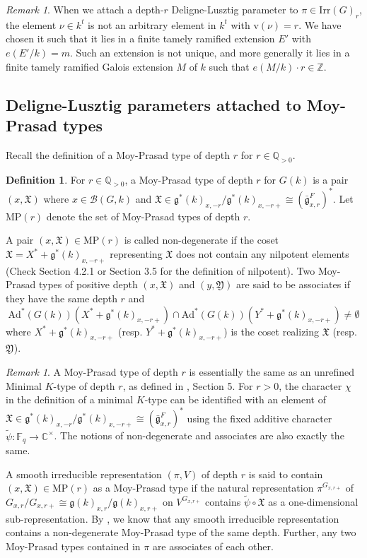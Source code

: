 \documentclass[11 pt]{article}
\numberwithin{equation}{subsection}
\theoremstyle{definition}
\newtheorem{definition}[theorem]{Definition}
\theoremstyle{remark}
\newtheorem{remark}[theorem]{Remark}
\theoremstyle{conjecture}
\newcommand{\X}{\mathfrak X}
\newcommand{\fg}{\mathfrak g}
\newcommand{\bg}{\bar{\mathfrak g}}
\newcommand{\rv}{\mathrm{v}}
\newcommand{\Irr}{\mathrm{Irr}}
\newcommand{\Ad}{\mathrm{Ad}}
\newcommand{\Z}{\mathbb Z}
\newcommand{\Q}{\mathbb Q}
\newcommand{\C}{\mathbb C}
\newcommand{\F}{\mathbb F}
\newcommand{\mf}{\mathfrak}
\newcommand{\B}{\mathcal{B}}
\begin{document}
\begin{remark}
    When we attach a depth-$r$ Deligne-Lusztig parameter to $\pi\in \Irr(G)_r$, the element $\nu \in k^t$ is not an arbitrary element in $k^t$ with $\rv(\nu)=r$. We have chosen it such that it lies in a finite tamely ramified extension $E'$ with $e(E'/k)=m$. Such an extension is not unique, and more generally it lies in a finite tamely ramified Galois extension $M$ of $k$ such that $e(M/k)\cdot r \in \Z$. 
\end{remark}

\subsection{Deligne-Lusztig parameters attached to Moy-Prasad types}
Recall the definition of a Moy-Prasad type of depth $r$ for $r \in \Q_{>0}$.
\begin{definition}
    For $r \in \Q_{>0}$, a Moy-Prasad type of depth $r$  for $G(k)$ is a pair $(x, \X)$ where $x \in \B(G,k)$ and $\X \in \fg^*(k)_{x,-r}/\fg^*(k)_{x,-r+} \cong (\bg_{x,r}^F)^*$. Let $\mathrm{MP}(r)$ denote the set of Moy-Prasad types of depth $r$.
\end{definition}
A pair  $(x, \X) \in \mathrm{MP}(r)$ is called non-degenerate if the coset $\X = X^* + \fg^*(k)_{x,-r+}$ representing $\X$ does not contain any nilpotent elements (Check \cite{chendebackertsai} Section 4.2.1 or \cite{MP94} Section 3.5 for the definition of nilpotent). Two Moy-Prasad types of positive depth $(x,\X)$ and $(y,\mf Y)$ are said to be associates if they have the same depth $r$ and 
\begin{equation*}
    \Ad^*(G(k))(X^* + \fg^*(k)_{x,-r+}) \cap \Ad^*(G(k))(Y^* + \fg^*(k)_{x,-r+}) \neq \emptyset
\end{equation*}
where $X^* + \fg^*(k)_{x,-r+}$ (resp. $Y^* + \fg^*(k)_{x,-r+}$) is the coset realizing $\X$ (resp. $\mf Y$).  
\begin{remark}
    A Moy-Prasad type of depth $r$ is essentially the same as an unrefined Minimal $K$-type of depth $r$, as defined in \cite{MP94}, Section 5. For $r>0$, the character $\chi$ in the definition of a minimal $K$-type can be identified with an element of $\X\in \fg^*(k)_{x,-r}/\fg^*(k)_{x,-r+} \cong (\bg_{x,r}^F)^*$ using the fixed additive character $\tilde \psi :\F_q\rightarrow \C^\times$. The notions of non-degenerate and associates are also exactly the same.  
\end{remark}
 A smooth irreducible representation $(\pi,V)$ of depth $r$ is said to contain $(x,\X)\in \mathrm{MP}(r)$ as a Moy-Prasad type if the natural representation $\pi^{G_{x,r+}}$ of $G_{x,r}/G_{x,r+} \cong \fg(k)_{x,r}/\fg(k)_{x,r+}$ on $V^{G_{x,r+}}$ contains $\tilde\psi\circ \X$ as a one-dimensional sub-representation. By \cite[Theorem 5.2]{MP94}, we know that any smooth irreducible representation contains a non-degenerate Moy-Prasad type of the same depth. Further, any two Moy-Prasad types contained in $\pi$ are associates of each other. \par
\end{document}
